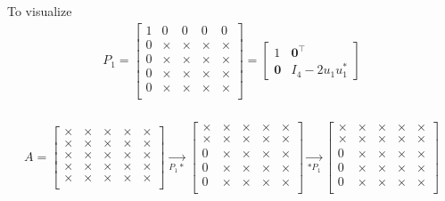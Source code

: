 \documentclass[journal]{IEEEtran}
\begin{document}
\newline 
To visualize
\newline
\begin{align}  
    P_1 = \begin{bmatrix}
        1 & 0 & 0 & 0 & 0 \\
        0 & \times & \times& \times& \times\\
        0 & \times & \times& \times& \times\\
        0 & \times & \times& \times& \times\\
        0 & \times & \times& \times& \times\\
    \end{bmatrix} = \begin{bmatrix}
        1 & \textbf{0}^{\top}\\
        \textbf{0} & I_4 - 2u_1u_1^*
    \end{bmatrix}    
\end{align}
\\
\begin{align}
    A = \begin{bmatrix}
        \times & \times & \times& \times& \times\\
        \times & \times & \times& \times& \times\\
        \times & \times & \times& \times& \times\\
        \times & \times & \times& \times& \times\\
        \times & \times & \times& \times& \times\\
    \end{bmatrix} \xrightarrow[P_1*]{} \begin{bmatrix}
        \times & \times & \times& \times& \times\\
        \times & \times & \times& \times& \times\\
        0 & \times & \times& \times& \times\\
        0 & \times & \times& \times& \times\\
        0 & \times & \times& \times& \times\\
    \end{bmatrix} \xrightarrow[*P_1]{}  \begin{bmatrix}
        \times & \times & \times& \times& \times\\
        \times & \times & \times& \times& \times\\
        0 & \times & \times& \times& \times\\
        0 & \times & \times& \times& \times\\
        0 & \times & \times& \times& \times\\
    \end{bmatrix}
\end{align}
\end{document}

